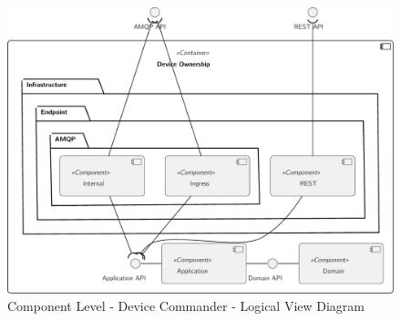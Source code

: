 \begin{figure}[H]
   \centering
   \includegraphics[page=1,width=0.7\columnwidth]{assets/diagrams/design/architectural/level3/logical/device-commander.pdf}
   \caption[Component Level - Device Commander - Logical View Diagram]{Component Level - Device Commander - Logical View Diagram}
   \label{fig:AppendixC:commander}
\end{figure}
